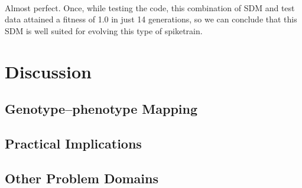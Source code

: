 \documentclass[a4paper,12pt]{article}
\begin{document}
\paragraph{}Almost perfect. Once, while testing the code, this combination of SDM and test data attained a fitness of 1.0 in just 14 generations, so we can conclude that this SDM is well suited for evolving this type of spiketrain.

\section{Discussion}
\subsection{Genotype--phenotype Mapping}

\subsection{Practical Implications}

\subsection{Other Problem Domains}
\end{document}
